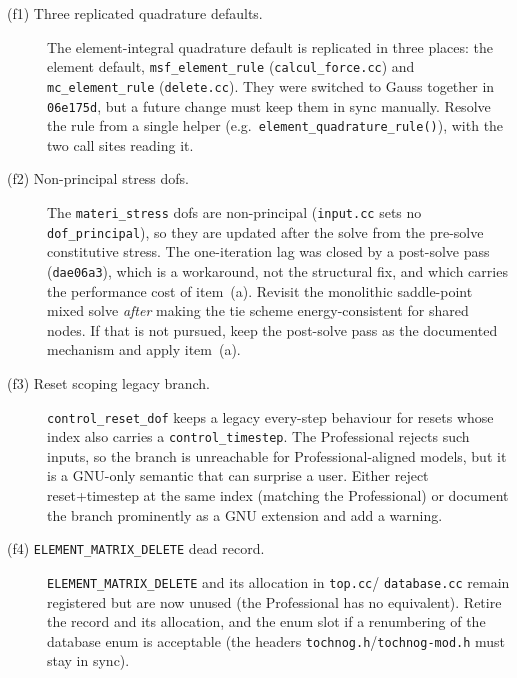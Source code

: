 \documentclass[11pt,a4paper]{report}
\newcommand{\code}[1]{\texttt{#1}}
\begin{document}
\begin{description}
  \item[(f1) Three replicated quadrature defaults.] The element-integral
        quadrature default is replicated in three places: the element default,
        \code{msf\_\allowbreak element\_\allowbreak rule} (\code{calcul\_\allowbreak force.cc}) and \code{mc\_\allowbreak element\_\allowbreak rule}
        (\code{delete.cc}). They were switched to Gauss together in
        \code{06e175d}, but a future change must keep them in sync manually.
        Resolve the rule from a single helper (e.g.\
        \code{element\_\allowbreak quadrature\_\allowbreak rule()}), with the two call sites reading it.

  \item[(f2) Non-principal stress dofs.] The \code{materi\_\allowbreak stress} dofs are
        non-principal (\code{input.cc} sets no \code{dof\_\allowbreak principal}), so they are
        updated after the solve from the pre-solve constitutive stress. The
        one-iteration lag was closed by a post-solve pass (\code{dae06a3}), which
        is a workaround, not the structural fix, and which carries the
        performance cost of item~(a). Revisit the monolithic saddle-point mixed
        solve \emph{after} making the tie scheme energy-consistent for shared
        nodes. If that is not pursued, keep the post-solve pass as the documented
        mechanism and apply item~(a).

  \item[(f3) Reset scoping legacy branch.] \code{control\_\allowbreak reset\_\allowbreak dof} keeps a
        legacy every-step behaviour for resets whose index also carries a
        \code{control\_\allowbreak timestep}. The Professional rejects such inputs, so the
        branch is unreachable for Professional-aligned models, but it is a
        GNU-only semantic that can surprise a user. Either reject
        reset+timestep at the same index (matching the Professional) or document
        the branch prominently as a GNU extension and add a warning.

  \item[(f4) \code{ELEMENT\_\allowbreak MATRIX\_\allowbreak DELETE} dead record.]
        \code{ELEMENT\_\allowbreak MATRIX\_\allowbreak DELETE} and its allocation in \code{top.cc}/
        \code{database.cc} remain registered but are now unused (the
        Professional has no equivalent). Retire the record and its allocation,
        and the enum slot if a renumbering of the database enum is acceptable
        (the headers \code{tochnog.h}/\code{tochnog-mod.h} must stay in sync).


\end{description}
\end{document}
